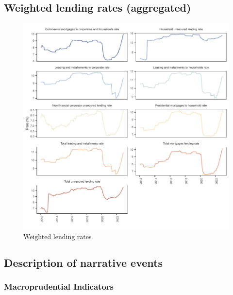 \documentclass[
  letterpaper,
  DIV=11,
  numbers=noendperiod]{scrartcl}
\begin{document}
\hypertarget{weighted-lending-rates-aggregated}{%
\subsection{Weighted lending rates
(aggregated)}\label{weighted-lending-rates-aggregated}}

\begin{figure}[H]

{\centering \includegraphics{UP_paper_files/figure-pdf/fig-bank_interest_rates-1.pdf}

}

\caption{\label{fig-bank_interest_rates}Weighted lending rates}

\end{figure}

\newpage

\hypertarget{description-of-narrative-events}{%
\subsection{Description of narrative
events}\label{description-of-narrative-events}}

\hypertarget{macroprudential-indicators}{%
\subsubsection{Macroprudential
Indicators}\label{macroprudential-indicators}}
\end{document}
